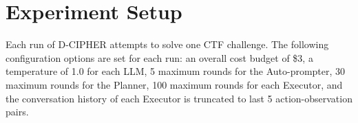\section{Experiment Setup} \label{sec:experiment_setup}


Each run of D-CIPHER attempts to solve one CTF challenge.
The following configuration options are set for each run:
an overall cost budget of \$3,
a temperature of 1.0 for each LLM,
5 maximum rounds for the Auto-prompter,
30 maximum rounds for the Planner,
100 maximum rounds for each Executor,
and the conversation history of each Executor is truncated to last 5 action-observation pairs.

